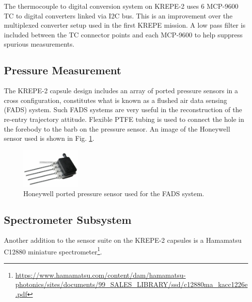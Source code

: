 \documentclass{article}
\begin{document}
The thermocouple to digital conversion system on KREPE-2 uses 6 MCP-9600 TC to digital converters linked via I2C bus. This is an improvement over the multiplexed converter setup used in the first KREPE mission. A low pass filter is included between the TC connector points and each MCP-9600 to help suppress spurious measurements.


\subsection{Pressure Measurement}
The KREPE-2 capsule design includes an array of ported pressure sensors in a cross configuration, constitutes what is known as a flushed air data sensing (FADS) system. Such FADS systems are very useful in the reconstruction of the re-entry trajectory attitude\cite{TODO}. Flexible PTFE tubing is used  to connect the hole in the forebody to the barb on the pressure sensor. An image of the Honeywell sensor used is shown in Fig. \ref{fig:pressure-sensor}.

\begin{figure}[H]
\centering
\includegraphics[width=3cm]{images/honeywell-sensor}
\caption{Honeywell ported pressure sensor used for the FADS system. }
\label{fig:pressure-sensor}
\end{figure}

\subsection{Spectrometer Subsystem}
Another addition to the sensor suite on the KREPE-2 capsules is a Hamamatsu C12880 miniature spectrometer\footnote{\url{https://www.hamamatsu.com/content/dam/hamamatsu-photonics/sites/documents/99_SALES_LIBRARY/ssd/c12880ma_kacc1226e.pdf}}.
\end{document}
